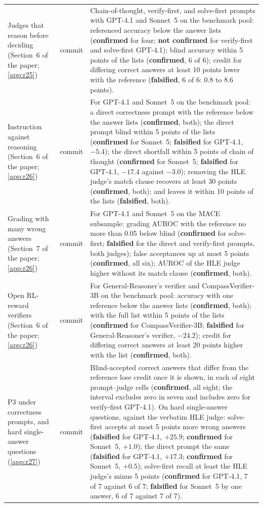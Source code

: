 {\begin{longtable}{L{3.2cm}L{1.1cm}L{8.7cm}}
Judges that reason before deciding (Section~6 of the paper; \cref{app:r25}) & commit & Chain-of-thought, verify-first, and solve-first prompts with GPT-4.1 and Sonnet~5 on the benchmark pool: referenced accuracy below the answer lists (\textbf{confirmed} for four; \textbf{not confirmed} for verify-first and solve-first GPT-4.1); blind accuracy within 5 points of the lists (\textbf{confirmed}, 6 of 6); credit for differing correct answers at least 10 points lower with the reference (\textbf{falsified}, 6 of 6: 0.8 to 8.6 points). \\
Instruction against reasoning (Section~6 of the paper; \cref{app:r26}) & commit & For GPT-4.1 and Sonnet~5 on the benchmark pool: a direct correctness prompt with the reference below the answer lists (\textbf{confirmed}, both); the direct prompt blind within 5 points of the lists (\textbf{confirmed} for Sonnet~5; \textbf{falsified} for GPT-4.1, $-5.4$); the direct shortfall within 5 points of chain of thought (\textbf{confirmed} for Sonnet~5; \textbf{falsified} for GPT-4.1, $-17.4$ against $-3.0$); removing the HLE judge's match clause recovers at least 30 points (\textbf{confirmed}, both); and leaves it within 10 points of the lists (\textbf{falsified}, both). \\
Grading with many wrong answers (Section~7 of the paper; \cref{app:r26}) & commit & For GPT-4.1 and Sonnet~5 on the \textsc{MACE} subsample: grading AUROC with the reference no more than 0.05 below blind (\textbf{confirmed} for solve-first; \textbf{falsified} for the direct and verify-first prompts, both judges); false acceptances up at most 5 points (\textbf{confirmed}, all six); AUROC of the HLE judge higher without its match clause (\textbf{confirmed}, both). \\
Open RL-reward verifiers (Section~6 of the paper; \cref{app:r26}) & commit & For General-Reasoner's verifier and CompassVerifier-3B on the benchmark pool: accuracy with one reference below the answer lists (\textbf{confirmed}, both); with the full list within 5 points of the lists (\textbf{confirmed} for CompassVerifier-3B; \textbf{falsified} for General-Reasoner's verifier, $-24.2$); credit for differing correct answers at least 20 points higher with the list (\textbf{confirmed}, both). \\
P3 under correctness prompts, and hard single-answer questions (\cref{app:r27}) & commit & Blind-accepted correct answers that differ from the reference lose credit once it is shown, in each of eight prompt--judge cells (\textbf{confirmed}, all eight; the interval excludes zero in seven and includes zero for verify-first GPT-4.1). On hard single-answer questions, against the verbatim HLE judge: solve-first accepts at most 5 points more wrong answers (\textbf{falsified} for GPT-4.1, $+25.9$; \textbf{confirmed} for Sonnet~5, $+1.0$); the direct prompt the same (\textbf{falsified} for GPT-4.1, $+17.3$; \textbf{confirmed} for Sonnet~5, $+0.5$); solve-first recall at least the HLE judge's minus 5 points (\textbf{confirmed} for GPT-4.1, 7 of 7 against 6 of 7; \textbf{falsified} for Sonnet~5 by one answer, 6 of 7 against 7 of 7). \\

\end{longtable}}

